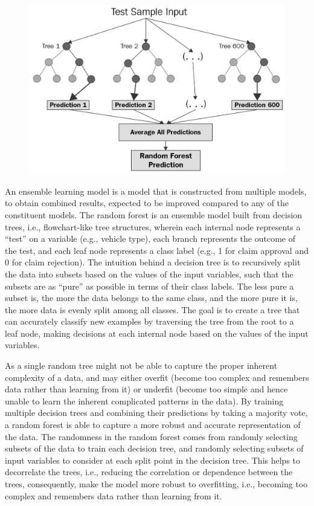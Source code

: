 \documentclass{article}
\begin{document}
\begin{figure}
\includegraphics[width=0.9\linewidth]{./figures/rf-model.png}
\end{figure}

An ensemble learning model is a model that is constructed from multiple
models, to obtain combined results, expected to be improved compared to
any of the constituent models. The random forest is an ensemble model
built from decision trees, i.e., flowchart-like tree structures, wherein
each internal node represents a ``test'' on a variable (e.g., vehicle
type), each branch represents the outcome of the test, and each leaf
node represents a class label (e.g., 1 for claim approval and 0 for
claim rejection). The intuition behind a decision tree is to recursively
split the data into subsets based on the values of the input variables,
such that the subsets are as ``pure'' as possible in terms of their
class labels. The less pure a subset is, the more the data belongs to
the same class, and the more pure it is, the more data is evenly split
among all classes. The goal is to create a tree that can accurately
classify new examples by traversing the tree from the root to a leaf
node, making decisions at each internal node based on the values of the
input variables.

As a single random tree might not be able to capture the proper inherent
complexity of a data, and may either overfit (become too complex and
remembers data rather than learning from it) or underfit (become too
simple and hence unable to learn the inherent complicated patterns in
the data). By training multiple decision trees and combining their
predictions by taking a majority vote, a random forest is able to
capture a more robust and accurate representation of the data. The
randomness in the random forest comes from randomly selecting subsets of
the data to train each decision tree, and randomly selecting subsets of
input variables to consider at each split point in the decision tree.
This helps to decorrelate the trees, i.e., reducing the correlation or
dependence between the trees, consequently, make the model more robust
to overfitting, i.e., becoming too complex and remembers data rather
than learning from it.
\end{document}
